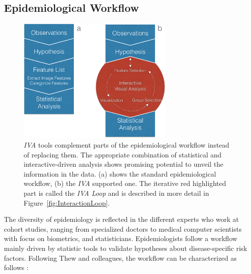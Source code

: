 \documentclass[journal]{style/vgtc} 			          %
\begin{document}
\subsection{Epidemiological Workflow} \label{EpidemiologicalWorkflow}
\begin{figure}[htb]
 \centering
 \includegraphics[width=3.0in]{figures/workflow_comparison}
 \caption{\emph{IVA} tools complement parts of the epidemiological workflow instead of replacing them. The appropriate combination of statistical and interactive-driven analysis shows promising potential to unveil the information in the data. (a) shows the standard epidemiological workflow, (b) the \emph{IVA} supported one. The iterative red highlighted part is called the \emph{IVA Loop} and is described in more detail in Figure~\ref{fig:InteractionLoop}.}
  \label{fig:WorkflowComparison}
\end{figure}
The diversity of epidemiology is reflected in the different experts who work at cohort studies, ranging from specialized doctors to medical computer scientists with focus on biometrics, and statisticians.
%
Epidemiologists follow a workflow mainly driven by statistic tools to validate hypotheses about disease-specific risk factors.
%
Following Thew and colleagues, the workflow can be characterized as follows \cite{Thew2009}:
%
\end{document}

